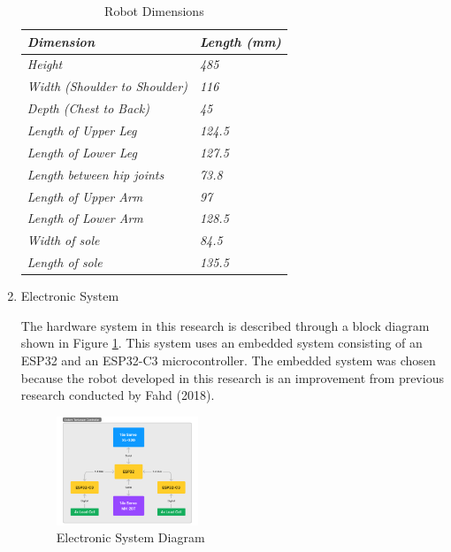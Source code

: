 \begin{enumerate}[label=\Alph*.]
    \begin{table}[h]
      \centering
      \caption{Robot Dimensions}
      \begin{tabular}{>{\itshape}l >{\itshape}l}
        \toprule
        \textit{Dimension} & \textit{Length (mm)} \\
        \midrule
        Height & 485 \\
        Width (Shoulder to Shoulder) & 116 \\
        Depth (Chest to Back) & 45 \\
        Length of Upper Leg & 124.5 \\
        Length of Lower Leg & 127.5 \\
        Length between hip joints & 73.8 \\
        Length of Upper Arm & 97 \\
        Length of Lower Arm & 128.5 \\
        Width of sole & 84.5 \\
        Length of sole & 135.5 \\
        \bottomrule
      \end{tabular}
      \label{tab:Dimensi_Robot}
    \end{table}

    \item Electronic System
    \label{subsec:electronicsystem}

    \hspace*{1em} The hardware system in this research is described through a block diagram shown in Figure \ref{fig:Diagram_Elektronik}. This system uses an embedded system consisting of an ESP32 and an ESP32-C3 microcontroller. The embedded system was chosen because the robot developed in this research is an improvement from previous research conducted by Fahd (2018). 

    \begin{figure} [h] \centering
      \includegraphics[width=0.4\textwidth]{gambar/Diagram_Elektronik.png}
      \caption{Electronic System Diagram}
      \label{fig:Diagram_Elektronik}
    \end{figure}


\end{enumerate}
